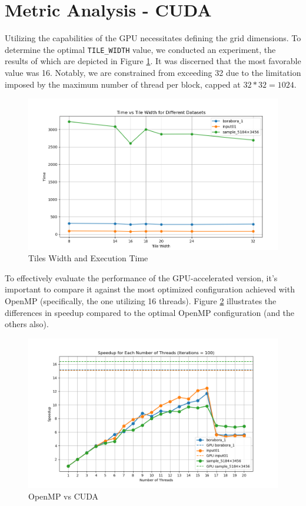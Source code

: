 \documentclass[sigconf]{acmart}
\begin{document}
\section{Metric Analysis - CUDA}
Utilizing the capabilities of the GPU necessitates defining the grid dimensions. To determine the optimal \texttt{TILE\_WIDTH} value, we conducted an experiment, the results of which are depicted in Figure \ref{fig2}. It was discerned that the most favorable value was 16. Notably, we are constrained from exceeding 32 due to the limitation imposed by the maximum number of thread per block, capped at $32 * 32 = 1024$.

\begin{figure}[h]
  \centering
  \includegraphics[width=\linewidth]{images/tilesss.png}
  \caption{Tiles Width and Execution Time}
 \label{fig2}
\end{figure}
To effectively evaluate the performance of the GPU-accelerated version, it's important to compare it against the most optimized configuration achieved with OpenMP (specifically, the one utilizing 16 threads). Figure \ref{fig3} illustrates the differences in speedup compared to the optimal OpenMP configuration (and the others also).

\begin{figure}[h]
  \centering
  \includegraphics[width=\linewidth]{images/openMPCUDA.png}
  \caption{OpenMP vs CUDA}
 \label{fig3}
\end{figure}
\end{document}

